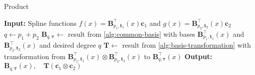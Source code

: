 \begin{algorithm}
    \caption{Product}\label{alg:multiplication}
    \begin{algorithmic}[1]
        \State \textbf{Input:} Spline functions $f(x) = \mathbf{B}_{p_1, \mathbf{t}_1}^{\top}(x) \mathbf{c}_1$ and $g(x) = \mathbf{B}_{p_2, \mathbf{t}_2}^{\top}(x) \mathbf{c}_2$
        \State $q \gets p_1 + p_2$
        \State $\mathbf B_{q, \boldsymbol{\tau}} \gets $ result from \cref{alg:common-basis} with bases $\mathbf{B}_{p_1, \mathbf{t}_1}^{\top}(x)$ and $\mathbf{B}_{p_2, \mathbf{t}_2}^{\top}(x)$ and desired degree $q$
        \State $\mathbf T \gets $ result from \cref{alg:basis-transformation} with transformation from $\mathbf B_{p_1, \mathbf{t}_1}^{\top}(x) \otimes \mathbf B_{p_2, \mathbf{t}_2}^{\top}(x)$ to $\mathbf B_{q, \boldsymbol{\tau}}^{\top}(x)$
        \State \textbf{Output:} $\mathbf B_{q, \boldsymbol{\tau}}(x), \quad\mathbf T (\mathbf c_1 \otimes \mathbf c_2)$
    \end{algorithmic}
\end{algorithm}


